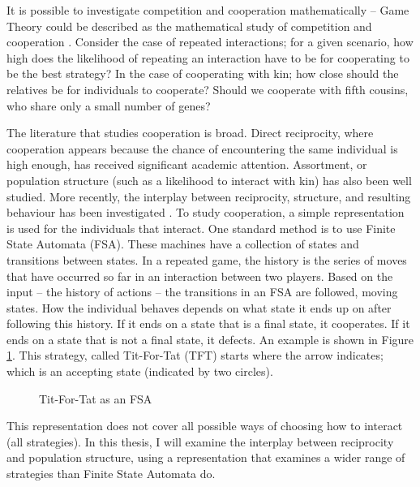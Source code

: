 \documentclass[a4paper,11pt,bcshonoursthesis,singlespace,oneside,thesisdraft,pdflatex]{cssethesis}
\renewcommand{\cite}{\citep} %
\begin{document}
It is possible to investigate competition and cooperation mathematically -- Game Theory could be described as the mathematical study of competition and cooperation \citep{binmore2007playing}. 
Consider the case of repeated interactions; for a given scenario, how high does the likelihood of repeating an interaction have to be for cooperating to be the best strategy? 
In the case of cooperating with kin; how close should the relatives be for individuals to cooperate? Should we cooperate with fifth cousins, who share only a small number of genes? 

The literature that studies cooperation is broad. Direct reciprocity, where cooperation appears because the chance of encountering the same individual is high enough, has received significant academic attention. 
Assortment, or population structure (such as a likelihood to interact with kin) has also been well studied. 
More recently, the interplay between reciprocity, structure, and resulting behaviour has been investigated \cite{van-veelen:PNAS:2012}. 
To study cooperation, a simple representation is used for the individuals that interact. One standard method is to use Finite State Automata (FSA). 
These machines have a collection of states and transitions between states. 
In a repeated game, the history is the series of moves that have occurred so far in an interaction between two players. 
Based on the input -- the history of actions -- the transitions in an FSA are followed, moving states. 
How the individual behaves depends on what state it ends up on after following this history. 
If it ends on a state that is a final state, it cooperates. If it ends on a state that is not a final state, it defects. An example is shown in Figure \ref{fig:fsa.tft.lang}. This strategy, called Tit-For-Tat (TFT) starts where the arrow indicates; which is an accepting state (indicated by two circles).

\begin{figure}
\center
{}
\caption{Tit-For-Tat as an FSA}
\label{fig:fsa.tft.lang}
\end{figure}

This representation does not cover all possible ways of choosing how to interact (all strategies). In this thesis, I will examine the interplay between reciprocity and population structure, using a representation that examines a wider range of strategies than Finite State Automata do. 
\end{document}
